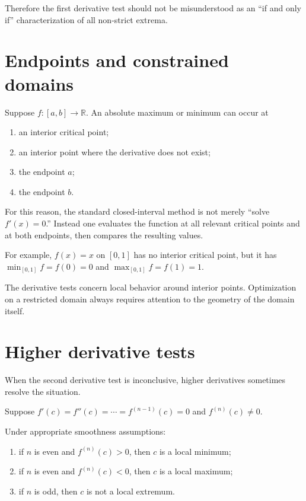 \documentclass{essay}
\begin{document}
Therefore the first derivative test should not be misunderstood as an ``if and only if'' characterization of all non-strict extrema.

\section{Endpoints and constrained domains}

Suppose \(f:[a,b]\to\mathbb{R}\).
An absolute maximum or minimum can occur at

\begin{enumerate}
    \item an interior critical point;
    \item an interior point where the derivative does not exist;
    \item the endpoint \(a\);
    \item the endpoint \(b\).
\end{enumerate}

For this reason, the standard closed-interval method is not merely ``solve \(f'(x)=0\).'' Instead one evaluates the function at all relevant critical points and at both endpoints, then compares the resulting values.

For example, \(f(x)=x\) on \([0,1]\) has no interior critical point, but it has \(\min_{[0,1]}f=f(0)=0\) and \(\max_{[0,1]}f=f(1)=1\).

The derivative tests concern local behavior around interior points. Optimization on a restricted domain always requires attention to the geometry of the domain itself.

\section{Higher derivative tests}

When the second derivative test is inconclusive, higher derivatives sometimes resolve the situation.

Suppose \(f'(c)=f''(c)=\cdots=f^{(n-1)}(c)=0\) and \(f^{(n)}(c)\neq0\).

Under appropriate smoothness assumptions:

\begin{enumerate}
    \item if \(n\) is even and \(f^{(n)}(c)>0\), then \(c\) is a local minimum;

    \item if \(n\) is even and \(f^{(n)}(c)<0\), then \(c\) is a local maximum;

    \item if \(n\) is odd, then \(c\) is not a local extremum.
\end{enumerate}
\end{document}
